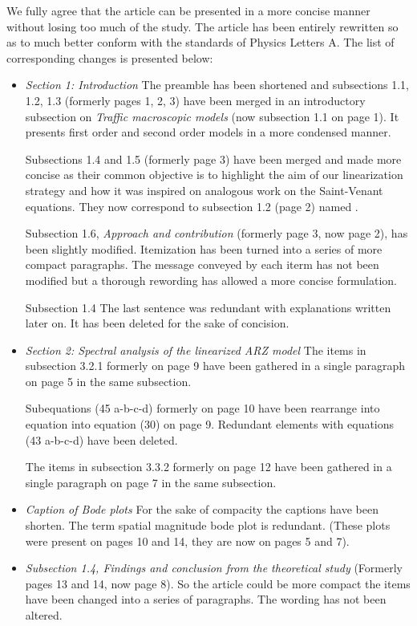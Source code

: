 \documentclass{article}
\begin{document}
We fully agree that the article can be presented in a more concise manner without losing too much of the study. The article has been entirely rewritten so as to much better conform with the standards of Physics Letters A. The list of corresponding changes is presented below:
\begin{itemize}
\item
\emph{Section 1: Introduction}
The preamble has been shortened and subsections 1.1, 1.2, 1.3 (formerly pages 1, 2, 3) have been merged in an introductory subsection on \textit{Traffic macroscopic models} (now subsection 1.1 on page 1). It presents first order and second order models in a more condensed manner.

Subsections 1.4 and 1.5 (formerly page 3) have been merged and made more concise as their common objective is to highlight the aim of our linearization strategy and how it was inspired on analogous work on the Saint-Venant equations. They now correspond to subsection 1.2 (page 2) named .

Subsection 1.6, \textit{Approach and contribution} (formerly page 3, now page 2), has been slightly modified. Itemization has been turned into a series of more compact paragraphs. The message conveyed by each iterm has not been modified but a thorough rewording has allowed a more concise formulation.

Subsection 1.4 The last sentence was redundant with explanations written later on. It has been deleted for the sake of concision.

\item
\emph{Section 2: Spectral analysis of the linearized ARZ model}
The items in subsection 3.2.1 formerly on page 9 have been gathered in a single paragraph on page 5 in the same subsection. 

Subequations (45 a-b-c-d) formerly on page 10 have been rearrange into equation into equation (30) on page 9. Redundant elements with equations (43 a-b-c-d) have been deleted.

The items in subsection 3.3.2 formerly on page 12 have been gathered in a single paragraph on page 7 in the same subsection. 

\item
\emph{Caption of Bode plots}
For the sake of compacity the captions have been shorten. The term spatial magnitude bode plot is redundant. (These plots were present on pages 10 and 14, they are now on pages 5 and 7).

\item
\emph{Subsection 1.4, Findings and conclusion from the theoretical study}
(Formerly pages 13 and 14, now page 8). So the article could be more compact the items have been changed into a series of paragraphs. The wording has not been altered.


\end{itemize}
\end{document}
